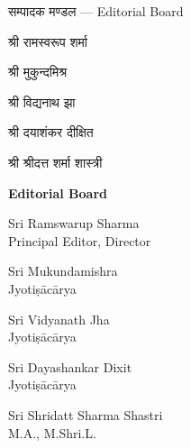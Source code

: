 \documentclass[11pt,a4paper]{article}
\newcommand{\dev}[1]{{\devanagarifont #1}}
\newcommand{\devbold}[1]{{\devanagarifontbold #1}}
\newenvironment{simpleverse}{%
  \list{}{\itemsep 0pt \parsep 0pt \topsep 4pt \leftmargin 2em}%
  \item\relax\ignorespaces
}{\endlist}
\newenvironment{paracol}[1]{\begingroup}{\endgroup}
\newenvironment{leftcolumn*}{\begingroup}{\endgroup}
\newenvironment{rightcolumn}{\begingroup}{\endgroup}
\begin{document}
\begin{paracol}{2}
\begin{leftcolumn*}
\begin{center}
\devbold{सम्पादक मण्डल — Editorial Board}
\end{center}

\begin{simpleverse}
\dev{श्री रामस्वरूप शर्मा}\\
\hspace{2em}\dev{प्रधान सम्पादक, संचालक}

\dev{श्री मुकुन्दमिश्र}\\
\hspace{2em}\dev{ज्योतिषाचार्य}

\dev{श्री विद्यनाथ झा}\\
\hspace{2em}\dev{ज्योतिषाचार्य}

\dev{श्री दयाशंकर दीक्षित}\\
\hspace{2em}\dev{ज्योतिषाचार्य}

\dev{श्री श्रीदत्त शर्मा शास्त्री}\\
\hspace{2em}\dev{एम. ए., एम. श्री. एल.}
\end{simpleverse}
\end{leftcolumn*}

\begin{rightcolumn}
\begin{center}
\textbf{Editorial Board}
\end{center}

\begin{simpleverse}
Sri Ramswarup Sharma\\
\hspace{2em}Principal Editor, Director

Sri Mukundamishra\\
\hspace{2em}Jyotiṣācārya

Sri Vidyanath Jha\\
\hspace{2em}Jyotiṣācārya

Sri Dayashankar Dixit\\
\hspace{2em}Jyotiṣācārya

Sri Shridatt Sharma Shastri\\
\hspace{2em}M.A., M.Shri.L.
\end{simpleverse}
\end{rightcolumn}
\end{paracol}
\end{document}
